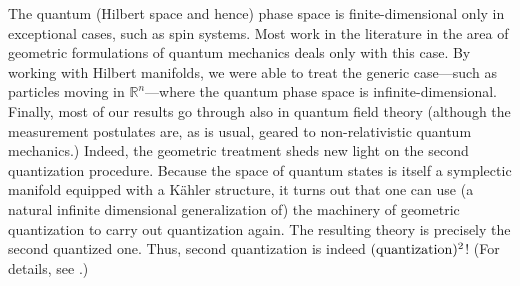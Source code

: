 \documentclass[12pt,aps,eqsecnum,tighten]{revtex4-2}
\def\R{\mathbb R}
\begin{document}
The quantum (Hilbert space and hence) phase space is
finite-dimensional only in exceptional cases, such as spin
systems. Most work in the literature in the area of geometric
formulations of quantum mechanics deals only with this case.  By
working with Hilbert manifolds, we were able to treat the generic
case---such as particles moving in $\R^n$---where the quantum phase
space is infinite-dimensional. Finally, most of our results go through
also in quantum field theory (although the measurement postulates are,
as is usual, geared to non-relativistic quantum mechanics.) Indeed,
the geometric treatment sheds new light on the second quantization
procedure. Because the space of quantum states is itself a symplectic
manifold equipped with a K\"ahler structure, it turns out that one can
use (a natural infinite dimensional generalization of) the machinery
of geometric quantization to carry out quantization again. The
resulting theory is precisely the second quantized one. Thus, second
quantization is indeed $({\rm quantization})^2$!  (For details, see
\cite{thesis}.)
\end{document}
